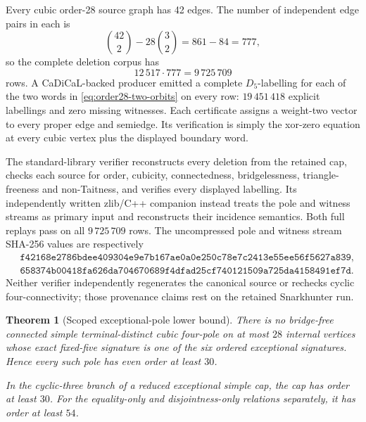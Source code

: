 \documentclass[11pt]{article}
\newtheorem{theorem}{Theorem}[section]
\theoremstyle{definition}
\theoremstyle{remark}
\begin{document}
Every cubic order-28 source graph has 42 edges.  The number of
independent edge pairs in each is
\[
       \binom{42}{2}-28\binom32=861-84=777,
\]
so the complete deletion corpus has
\[
                         12\,517\cdot777=9\,725\,709
\]
rows.  A CaDiCaL-backed producer emitted a complete \(D_5\)-labelling
for each of the two words in \eqref{eq:order28-two-orbits} on every
row: \(19\,451\,418\) explicit labellings and zero missing witnesses.
Each certificate assigns a weight-two vector to every proper edge and
semiedge.  Its verification is simply the xor-zero equation at every
cubic vertex plus the displayed boundary word.

The standard-library verifier reconstructs every deletion from the
retained cap, checks each source for order, cubicity, connectedness,
bridgelessness, triangle-freeness and non-Taitness, and verifies every
displayed labelling.  Its independently written zlib/C++ companion
instead treats the pole and witness streams as primary input and
reconstructs their incidence semantics.  Both full replays pass on all
\(9\,725\,709\) rows.  The uncompressed pole and witness stream
SHA-256 values are respectively
\[
\begin{aligned}
&\texttt{f42168e2786bdee409304e9e7b167ae0a0e250c78e7c2413e55ee56f5627a839},\\
&\texttt{658374b00418fa626da704670689f4dfad25cf740121509a725da4158491ef7d}.
\end{aligned}
\]
Neither verifier independently regenerates the canonical source or
rechecks cyclic four-connectivity; those provenance claims rest on the
retained Snarkhunter run.

\begin{theorem}[Scoped exceptional-pole lower bound]
\label{thm:exceptional-order30}
There is no bridge-free connected simple terminal-distinct cubic
four-pole on at most \(28\) internal vertices whose exact fixed-five
signature is one of the six ordered exceptional signatures.  Hence
every such pole has even order at least \(30\).

In the cyclic-three branch of a reduced exceptional simple cap, the
cap has order at least \(30\).  For the equality-only and
disjointness-only relations separately, it has order at least \(54\).
\end{theorem}
\end{document}

